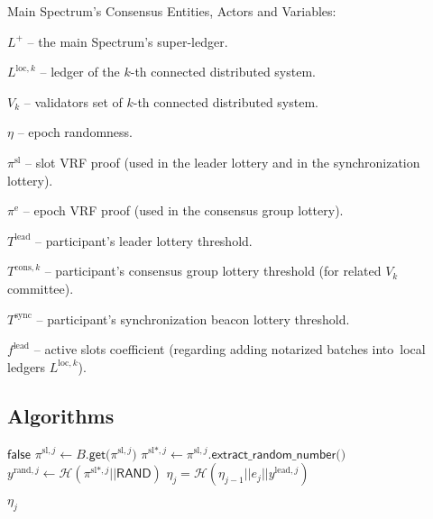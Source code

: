 \noindent
Main Spectrum's Consensus Entities, Actors and Variables:
\begin{legal}
    \item[] $L^+$ -- the main Spectrum's super-ledger.
    \item[] $L^{\text{loc}, k}$ -- ledger of the $k$-th connected distributed system.
    \item[] $V_k$ -- validators set of $k$-th connected distributed system.
    \item[] $\eta$ -- epoch randomness.
    \item[] $\pi^{\text{sl}}$ -- slot VRF proof (used in the leader lottery and in the synchronization lottery).
    \item[] $\pi^{\text{e}}$ -- epoch VRF proof (used in the consensus group lottery).
    \item[] $T^{\text{lead}}$ -- participant's leader lottery threshold.
    \item[] $T^{\text{cons},k}$ -- participant's consensus group lottery threshold (for related $V_k$ committee).
    \item[] $T^{\text{sync}}$ -- participant's synchronization beacon lottery threshold.
    \item[] $f^{\text{lead}}$ -- active slots coefficient (regarding adding notarized batches into\
    local ledgers $L^{\text{loc}, k}$).
\end{legal}

\newpage

\subsection{Algorithms}\label{subsec:algorithms}

\begin{algorithm}[ht]
    \begin{algorithmic}[1]
        \caption{${\mathcal{F}_{\text{LB}}(e_j, C_{\text{loc}})}$}
        \If{${e_j \geq 2}$}
            \State \Return ${\textsf{false}}$
        \EndIf
            \State ${\pi^{\text{sl}, j} \leftarrow B\textsf{.get(}\pi^{\text{sl}, j}\textsf{)}}$
            \State ${\pi^{\text{sl}*, j} \leftarrow \pi^{\text{sl}, j}\textsf{.extract\_random\_number()}}$
            \State $y^{\text{rand}, j} \leftarrow \mathcal{H}(\pi^{\text{sl}*, j} || \textsf{RAND})$
            \State ${\eta_j = \mathcal{H}(\eta_{j - 1} || e_j || y^{\text{lead}, j})}$

        \EndFor
        \State \Return $\eta_j$
    \end{algorithmic}\label{alg:algorithm-3}
\end{algorithm}

